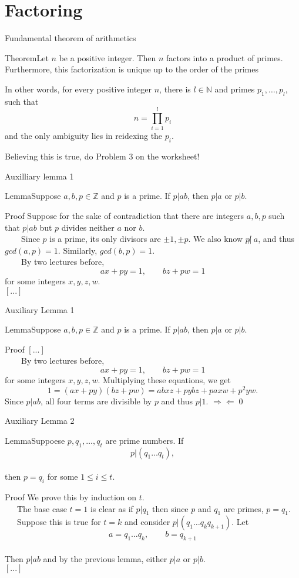 \documentclass{beamer}
\def\bl[#1]#2{\begin{block}{#1}#2\end{block}}
\begin{document}
\section{Factoring}

\begin{frame}{Fundamental theorem of arithmetics}
\bl[Theorem]{Let $n$ be a positive integer. Then $n$ factors into a product of primes. Furthermore, this factorization is unique up to the order of the primes}
In other words, for every positive integer $n$, there is $l\in\mathbb{N}$ and primes $p_1,\dots,p_l$, such that 
\[
n=\prod_{i=1}^lp_i
\]
and the only ambiguity lies in reidexing the $p_i$.

\center Believing this is true, do Problem 3 on the worksheet!
\end{frame}

\begin{frame}{Auxilliary lemma 1}
\bl[Lemma]{Suppose $a,b,p\in\mathbb{Z}$ and $p$ is a prime. If $p|ab$, then $p|a$ or $p|b$.}
\bl[Proof]{
Suppose for the sake of contradiction that there are integers $a,b,p$ such that $p|ab$ but $p$ divides neither $a$ nor $b$.\\
~~~~Since $p$ is a prime, its only divisors are $\pm 1,\pm p$. We also know $p\not|~a$, and thus $gcd(a,p)=1$. Similarly, $gcd(b,p)=1$. \\
~~~~By two lectures before,
\[
ax+py=1,\qquad bz+pw=1
\]
for some integers $x,y,z,w$.\\
$[...]$
}

\end{frame}

\begin{frame}{Auxiliary Lemma 1}
\bl[Lemma]{Suppose $a,b,p\in\mathbb{Z}$ and $p$ is a prime. If $p|ab$, then $p|a$ or $p|b$.}

\bl[Proof]{
$[...]$\\
~~~~By two lectures before,
\[
ax+py=1,\qquad bz+pw=1
\]
for some integers $x,y,z,w$. Multiplying these equations, we get
\[
1=(ax+py)(bz+pw)=abxz+pybz+paxw+p^2yw.
\]
Since $p|ab$, all four terms are divisible by $p$ and thus $p|1$. $\Rightarrow\Leftarrow$\qed
}
\end{frame}

\begin{frame}{Auxiliary Lemma 2}
\bl[Lemma]{Suppoese $p,q_1,\dots, q_t$ are prime numbers. If\vspace{-0.2cm}
\[
p|(q_1\dots q_t),
\]\vspace{-0.6cm}\\
then $p=q_i$ for some $1\leq i\leq t$.}

\bl[Proof]{
We prove this by induction on $t$.\\
~~~The base case $t=1$ is clear as if $p|q_1$ then since $p$ and $q_1$ are primes, $p=q_1$.\\
~~~Suppose this is true for $t=k$ and consider $p|(q_1\dots q_kq_{k+1})$. Let\vspace{-0.2cm}
\[
a=q_1\dots q_k,\qquad b=q_{k+1}
\]\vspace{-0.6cm}\\
Then $p|ab$ and by the previous lemma, either $p|a$ or $p|b$.\\
$[...]$
}
\end{frame}
\end{document}
